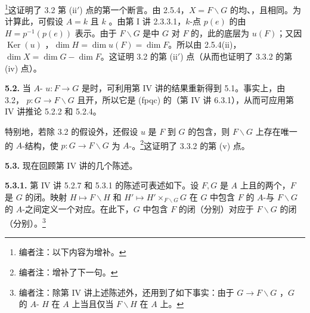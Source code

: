 \footnote{编者注：以下内容为增补。}这证明了 3.2 第 (ii$'$) 点的第一个断言。由 2.5.4，$X=F\backslash G$ 的均、，且相同。为计算此，可假设 $A=k$ 且 $k$ 。由第 I 讲 2.3.3.1，$k$-点 $p(e)$ 的由 $H=p^{-1}(p(e))$ 表示。由于 $F\backslash G$ 是中 $G$ 对 $F$ 的，此的底层为 $u(F)$；又因 $\operatorname{Ker}(u)$ ，$\dim H=\dim u(F)=\dim F$。所以由 2.5.4(ii)，$\dim X=\dim G-\dim F$。这证明 3.2 的第 (ii$'$) 点（从而也证明了 3.3.2 的第 (iv) 点）。

\textbf{5.2.} 当 $A$- $u:F\to G$ 是时，可利用第 IV 讲的结果重新得到 5.1。事实上，由 3.2， $p:G\to F\backslash G$ 且开，所以它是 (fpqc) 的（第 IV 讲 6.3.1），从而可应用第 IV 讲推论 5.2.2 和 5.2.4。

特别地，若除 3.2 的假设外，还假设 $u$ 是 $F$ 到 $G$ 的包含，则 $F\backslash G$ 上存在唯一的 $A$-结构，使 $p:G\to F\backslash G$ 为 $A$-。\footnote{编者注：增补了下一句。}这证明了 3.3.2 的第 (v) 点。

\textbf{5.3.} 现在回顾第 IV 讲的几个陈述。

\textbf{5.3.1.} 第 IV 讲 5.2.7 和 5.3.1 的陈述可表述如下。设 $F,G$ 是 $A$ 上且的两个，$F$ 是 $G$ 的闭。映射 $H\mapsto F\backslash H$ 和 $H'\mapsto H'\times_{F\backslash G}G$ 在 $G$ 中包含 $F$ 的 $A$-与 $F\backslash G$ 的 $A$-之间定义一个对应。在此下，$G$ 中包含 $F$ 的闭（分别）对应于 $F\backslash G$ 的闭（分别）。\footnote{编者注：除第 IV 讲上述陈述外，还用到了如下事实：由于 $G\to F\backslash G$ ，$G$ 的 $A$- $H$ 在 $A$ 上当且仅当 $F\backslash H$ 在 $A$ 上。}

